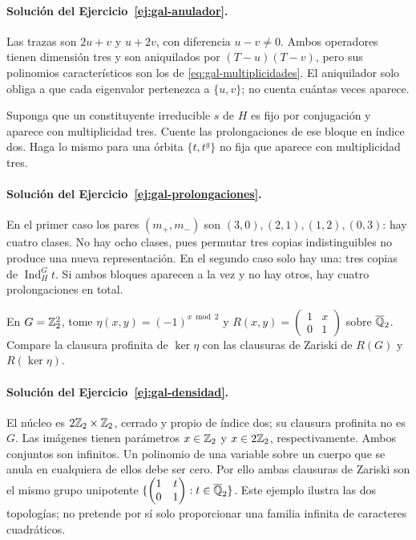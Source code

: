\paragraph{Solución del Ejercicio~\ref{ej:gal-anulador}.}
Las trazas son $2u+v$ y $u+2v$, con diferencia $u-v\ne0$.
Ambos operadores tienen dimensión tres y son aniquilados
por $(T-u)(T-v)$, pero sus polinomios característicos son
los de \eqref{eq:gal-multiplicidades}.
El aniquilador solo obliga a que cada eigenvalor pertenezca
a $\{u,v\}$; no cuenta cuántas veces aparece.

\begin{ejercicio}\label{ej:gal-prolongaciones}
Suponga que un constituyente irreducible $s$ de $H$ es fijo
por conjugación y aparece con multiplicidad tres.
Cuente las prolongaciones de ese bloque en índice dos.
Haga lo mismo para una órbita $\{t,t^g\}$ no fija que aparece
con multiplicidad tres.
\end{ejercicio}

\paragraph{Solución del Ejercicio~\ref{ej:gal-prolongaciones}.}
En el primer caso los pares $(m_+,m_-)$ son
$(3,0),(2,1),(1,2),(0,3)$: hay cuatro clases.
No hay ocho clases, pues permutar tres copias indistinguibles
no produce una nueva representación.
En el segundo caso solo hay una: tres copias de
$\operatorname{Ind}_H^G t$.
Si ambos bloques aparecen a la vez y no hay otros,
hay cuatro prolongaciones en total.

\begin{ejercicio}\label{ej:gal-densidad}
En $G=\mathbb{Z}_2^2$, tome
$\eta(x,y)=(-1)^{x\bmod2}$ y
$R(x,y)=\begin{pmatrix}1&x\\0&1\end{pmatrix}$ sobre
$\overline{\mathbb{Q}}_2$.
Compare la clausura profinita de $\ker\eta$ con las clausuras
de Zariski de $R(G)$ y $R(\ker\eta)$.
\end{ejercicio}

\paragraph{Solución del Ejercicio~\ref{ej:gal-densidad}.}
El núcleo es $2\mathbb{Z}_2\times\mathbb{Z}_2$, cerrado y propio de índice dos;
su clausura profinita no es $G$.
Las imágenes tienen parámetros $x\in\mathbb{Z}_2$ y $x\in2\mathbb{Z}_2$,
respectivamente. Ambos conjuntos son infinitos.
Un polinomio de una variable sobre un cuerpo que se anula
en cualquiera de ellos debe ser cero.
Por ello ambas clausuras de Zariski son el mismo grupo
unipotente $\{\begin{pmatrix}1&t\\0&1\end{pmatrix}:t\in\overline{\mathbb{Q}}_2\}$.
Este ejemplo ilustra las dos topologías; no pretende por sí
solo proporcionar una familia infinita de caracteres cuadráticos.


